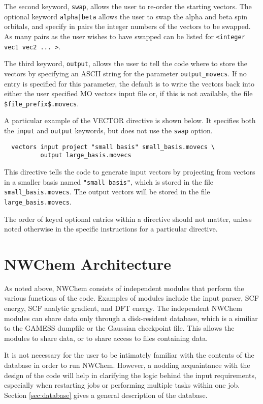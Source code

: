The second keyword, \verb+swap+, allows the user to re-order the
starting vectors.  The optional keyword \verb+alpha|beta+ allows the
user to swap the alpha and beta spin orbitals, and specify in pairs
the integer numbers of the vectors to be swapped.  As many pairs as
the user wishes to have swapped can be listed for {\tt <integer vec1
vec2 ... >}.

The third keyword, \verb+output+, allows the user to tell the code
where to store the vectors by specifying an ASCII string for the
parameter {\tt output\_movecs}.  If no entry is specified for this
parameter, the default is to write the vectors back into either the user
specified MO vectors input file or, if this is not available, the file
\verb+$file_prefix$.movecs+.

A particular example of the VECTOR directive is shown below.  It specifies
both the \verb+input+ and \verb+output+ keywords, but does not use the 
\verb+swap+ option.

\begin{verbatim}
  vectors input project "small basis" small_basis.movecs \
          output large_basis.movecs
\end{verbatim}

This directive tells the code to generate input vectors by projecting
from vectors in a smaller basis named \verb+"small basis"+, which is
stored in the file \verb+small_basis.movecs+.  The output vectors will be
stored in the file \verb+large_basis.movecs+.

The order of keyed optional entries within a directive should not matter,
unless noted otherwise in the specific instructions for a particular
directive.

\section{NWChem Architecture}
\label{sec:arch}

As noted above, NWChem consists of independent modules that perform
the various functions of the code.  Examples of modules include the
input parser, SCF energy, SCF analytic gradient, and DFT energy.  The
independent NWChem modules can share data only through a disk-resident
database, which is a similiar to the GAMESS dumpfile or the Gaussian
checkpoint file.  This allows the modules to share data, or to share
access to files containing data.

It is not necessary for the user to be intimately familiar with the
contents of the database in order to run NWChem.  However, a nodding
acquaintance with the design of the code will help in clarifying the
logic behind the input requirements, especially when restarting jobs
or performing multiple tasks within one job.  Section
\ref{sec:database} gives a general description of the database.

